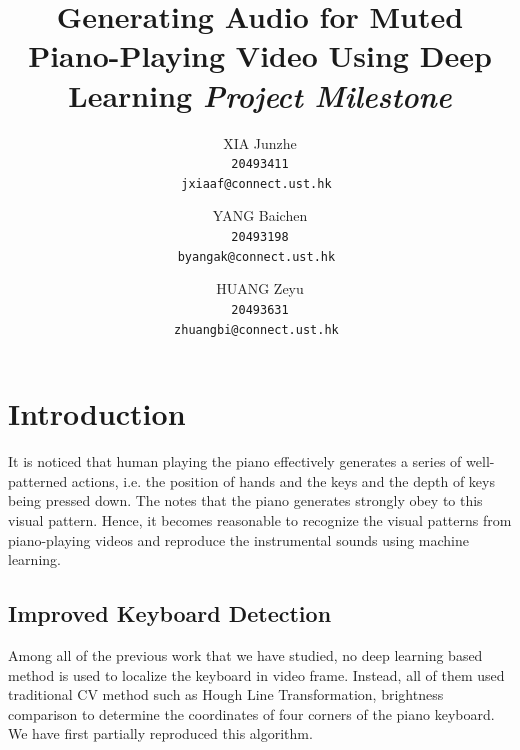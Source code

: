 \documentclass[10pt,twocolumn,letterpaper]{article}
\begin{document}
\title{Generating Audio for Muted Piano-Playing Video Using Deep Learning \newline \newline \textit{Project Milestone}}


\author{XIA Junzhe\\
\tt\small 20493411\\
{\tt\small jxiaaf@connect.ust.hk}
\and
YANG Baichen\\
\tt\small 20493198\\
{\tt\small byangak@connect.ust.hk}
\and
HUANG Zeyu\\
\tt\small 20493631\\
{\tt\small zhuangbi@connect.ust.hk}
}


\maketitle

\section{Introduction}
It is noticed that human playing the piano effectively generates a series of well-patterned actions,
i.e. the position of hands and the keys and the depth of keys being pressed down.
The notes that the piano generates strongly obey to this visual pattern.
Hence, it becomes reasonable to recognize the visual patterns from piano-playing videos and reproduce the instrumental sounds using machine learning.

\subsection{Improved Keyboard Detection}

Among all of the previous work that we have studied, no deep learning based method is used to localize the keyboard in video frame. Instead, all of them used traditional CV method such as Hough Line Transformation, brightness comparison to determine the coordinates of four corners of the piano keyboard. We have first partially reproduced this algorithm.
\end{document}
